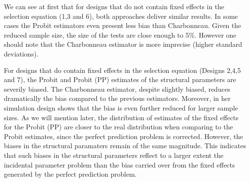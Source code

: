 We can see at first that for designs that do not contain fixed effects in the selection equation (1,3 and 6), both approaches deliver similar results. In some cases the Probit estimators even present less bias than Charbonneau. Given the reduced sample size, the size of the tests are close enough to 5\%. However one should note that the Charbonneau estimator is more imprecise (higher standard deviations).

For designs that do contain fixed effects in the selection equation (Designs 2,4,5 and 7), the Probit and Probit (PP) estimates of the structural parameters are severily biased. The Charbonneau estimator, despite slightly biased, reduces dramatically the bias compared to the previous estimators. Moreover, in her simulation design \cite{charbonneau2017multiple} shows that the bias is even further reduced for larger sample sizes. As we will mention later, the distribution of estimates of the fixed effects for the Probit (PP) are closer to the real distribution when comparing to the Probit estimates, since the perfect prediction problem is corrected. However, the biases in the structural paramaters remain of the same magnitude. This indicates that such biases in the structural parameters reflect to a larger extent the incidental parameter problem than the bias carried over from the fixed effects generated by the perfect prediction problem.

